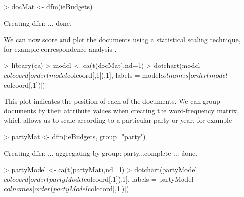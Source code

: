 \documentclass{article}
\begin{document}
\begin{Schunk}
\begin{Sinput}
> docMat <- dfm(ieBudgets)
\end{Sinput}
\begin{Soutput}
Creating dfm: ... done. 
\end{Soutput}
\end{Schunk}

We can now score and plot the documents using a statistical scaling technique, for example correspondence analysis \citep{nenadic2007}.

\begin{Schunk}
\begin{Sinput}
> library(ca)
> model <- ca(t(docMat),nd=1)
> dotchart(model$colcoord[order(model$colcoord[,1]),1], labels = model$colnames[order(model$colcoord[,1])])
\end{Sinput}
\end{Schunk}

This plot indicates the position of each of the documents. We can group documents by their attribute values when creating the word-frequency matrix, which allows us to scale according to a particular party or year, for example

\begin{Schunk}
\begin{Sinput}
> partyMat <- dfm(ieBudgets, group="party")
\end{Sinput}
\begin{Soutput}
Creating dfm: ... aggregating by group: party...complete ... done. 
\end{Soutput}
\begin{Sinput}
> partyModel <- ca(t(partyMat),nd=1)
> dotchart(partyModel$colcoord[order(partyModel$colcoord[,1]),1], labels = partyModel$colnames[order(partyModel$colcoord[,1])])
\end{Sinput}
\end{Schunk}
%
%


\end{document}
